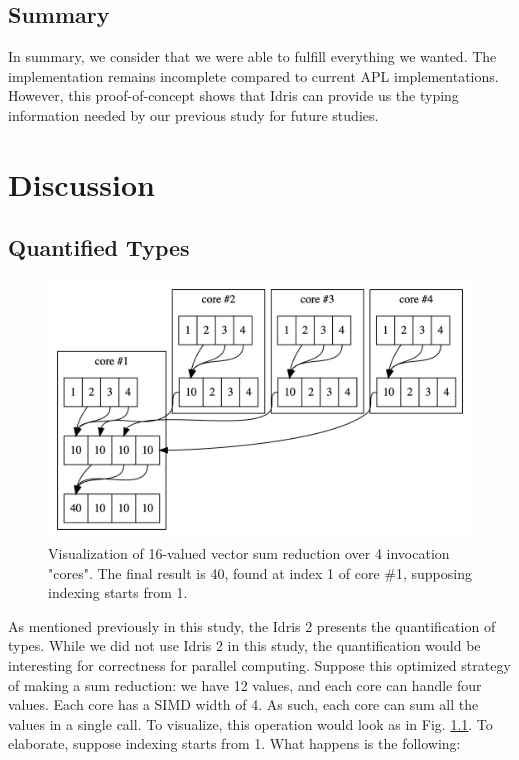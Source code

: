 \documentclass{report}
\begin{document}
\section*{Summary}

In summary, we consider that we were able to fulfill everything we wanted. The implementation remains incomplete compared to current APL implementations. However, this proof-of-concept shows that Idris can provide us the typing information needed by our previous study for future studies.

\chapter{Discussion}
\label{ch:discussion}

\section{Quantified Types}

\begin{figure}
  \centering
  \includegraphics[scale=0.25]{./assets/freduc.png}
  \caption{Visualization of 16-valued vector sum reduction over 4 invocation "cores". The final result is 40, found at index 1 of core \#1, supposing indexing starts from 1.}
  \label{fig:freduc}
\end{figure}

As mentioned previously in this study, the Idris 2 presents the quantification of types. While we did not use Idris 2 in this study, the quantification would be interesting for correctness for parallel computing. Suppose this optimized strategy of making a sum reduction: we have 12 values, and each core can handle four values. Each core has a SIMD width of 4. As such, each core can sum all the values in a single call. To visualize, this operation would look as in Fig. \ref{fig:freduc}. To elaborate, suppose indexing starts from 1. What happens is the following:
\end{document}
